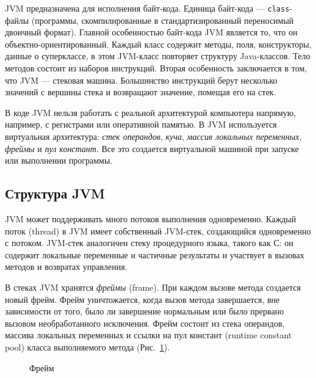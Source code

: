 JVM предназначена для исполнения байт-кода. Единица байт-кода --- \texttt{class}-файлы (программы, скомпилированные в 
стандартизированный переносимый двоичный формат). Главной особенностью байт-кода JVM является то, что он объектно-ориентированный. 
Каждый класс содержит методы, поля, конструкторы, данные о суперклассе, в этом JVM-класс повторяет структуру Java-классов. 
Тело методов состоит из наборов инструкций. Вторая особенность заключается в том, что JVM --- стековая машина. Большинство инструкций 
берут несколько значений с вершины стека и возвращают значение, помещая его на стек.

В коде JVM нельзя работать с реальной архитектурой компьютера напрямую, например, с регистрами или оперативной памятью. В JVM используется 
виртуальная архитектура: \emph{стек операндов}, \emph{куча}, \emph{массив локальных переменных}, \emph{фреймы} и \emph{пул констант}. 
Все это создается виртуальной машиной при запуске или выполнении программы.

\subsection{Структура JVM}

JVM может поддерживать много потоков выполнения одновременно. Каждый поток (thread) в JVM имеет собственный JVM-стек, 
создающийся одновременно с потоком. JVM-стек аналогичен стеку процедурного языка, такого как С: он содержит локальные переменные и 
частичные результаты и участвует в вызовах методов и возвратах управления.  

В стеках JVM хранятся \emph{фреймы} (frame). При каждом вызове метода создается новый фрейм. Фрейм уничтожается, 
когда вызов метода завершается, вне зависимости от того, было ли завершение нормальным или было прервано вызовом 
необработанного исключения. Фрейм состоит из стека операндов, массива локальных переменных и ссылки на пул констант 
(runtime constant pool) класса выполняемого метода (Рис.~\ref{pic_Frame}). 

\begin{figure} [h]
\caption{Фрейм}\label{pic_Frame}
\end{figure}

